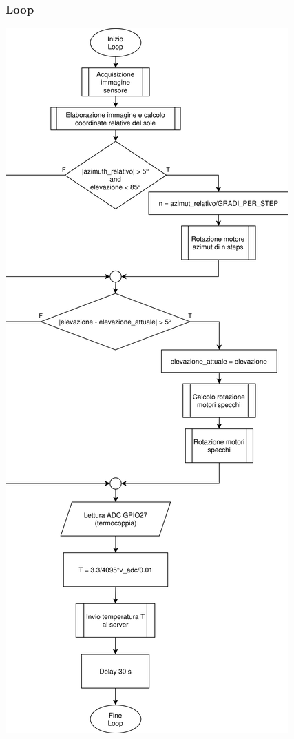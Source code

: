 \documentclass[12pt]{article}
\begin{document}
        \subsubsection{Loop}
            \begin{center}
                \includegraphics[height=\textheight-40pt]{Draws/Flowchart/Loop.png}
            \end{center}
        
\end{document}

